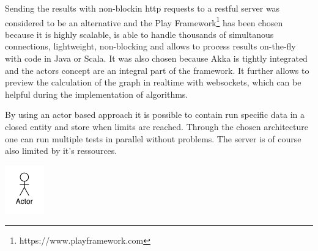 Sending the results with non-blockin http requests to a restful server was considered to be an alternative and the Play Framework\footnote{https://www.playframework.com} has been chosen because it is highly scalable, is able to handle thousands of simultanous connections, lightweight, non-blocking and allows to process results on-the-fly with code in Java or Scala. It was also chosen because Akka is tightly integrated and the actors concept are an integral part of the framework. It further allows to preview the calculation of the graph in realtime with websockets, which can be helpful during the implementation of algorithms.

By using an actor based approach it is possible to contain run specific data in a closed entity and store when limits are reached. Through the chosen architecture one can run multiple tests in parallel without problems. The server is of course also limited by it's ressources.

\includegraphics{graphics/monitoring}


